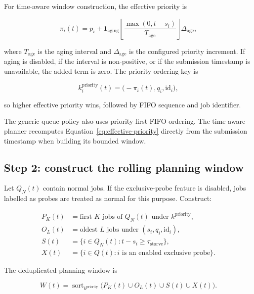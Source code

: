 \documentclass[11pt]{article}
\begin{document}
For time-aware window construction, the effective priority is

\begin{equation}
  \pi_i(t)
  = p_i
  + \mathbf{1}_{\mathrm{aging}}
    \left\lfloor
      \frac{\max(0,t-s_i)}{T_{\mathrm{age}}}
    \right\rfloor \Delta_{\mathrm{age}},
  \label{eq:effective-priority}
\end{equation}

where $T_{\mathrm{age}}$ is the aging interval and
$\Delta_{\mathrm{age}}$ is the configured priority increment.  If aging is
disabled, if the interval is non-positive, or if the submission timestamp is
unavailable, the added term is zero.  The priority ordering key is

\begin{equation}
  k_i^{\mathrm{priority}}(t)=\bigl(-\pi_i(t),q_i,\mathrm{id}_i\bigr),
  \label{eq:priority-key}
\end{equation}

so higher effective priority wins, followed by FIFO sequence and job identifier.

The generic queue policy also uses priority-first FIFO ordering.  The
time-aware planner recomputes Equation~\eqref{eq:effective-priority} directly
from the submission timestamp when building its bounded window.

\subsection{Step 2: construct the rolling planning window}

Let $Q_N(t)$ contain normal jobs.  If the exclusive-probe feature is disabled,
jobs labelled as probes are treated as normal for this purpose.  Construct:

\begin{align}
  P_K(t) &= \text{first }K\text{ jobs of }Q_N(t)
            \text{ under }k^{\mathrm{priority}}, \\
  O_L(t) &= \text{oldest }L\text{ jobs under }(s_i,q_i,\mathrm{id}_i), \\
  S(t)   &= \{i\in Q_N(t):t-s_i\ge \tau_{\mathrm{starve}}\}, \\
  X(t)   &= \{i\in Q(t):i\text{ is an enabled exclusive probe}\}.
\end{align}

The deduplicated planning window is

\begin{equation}
  W(t)=\operatorname{sort}_{k^{\mathrm{priority}}}
  \bigl(P_K(t)\cup O_L(t)\cup S(t)\cup X(t)\bigr).
  \label{eq:window}
\end{equation}
\end{document}
